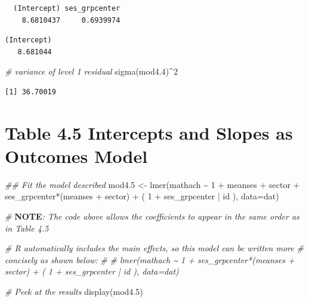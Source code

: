 \documentclass[
  letterpaper,
  DIV=11,
  numbers=noendperiod]{scrreprt}
\newenvironment{Shaded}{}{}
\newcommand{\AlertTok}[1]{\textcolor[rgb]{1.00,0.00,0.00}{\textbf{#1}}}
\newcommand{\AttributeTok}[1]{\textcolor[rgb]{0.49,0.56,0.16}{#1}}
\newcommand{\CommentTok}[1]{\textcolor[rgb]{0.38,0.63,0.69}{\textit{#1}}}
\newcommand{\DecValTok}[1]{\textcolor[rgb]{0.25,0.63,0.44}{#1}}
\newcommand{\DocumentationTok}[1]{\textcolor[rgb]{0.73,0.13,0.13}{\textit{#1}}}
\newcommand{\FloatTok}[1]{\textcolor[rgb]{0.25,0.63,0.44}{#1}}
\newcommand{\FunctionTok}[1]{\textcolor[rgb]{0.02,0.16,0.49}{#1}}
\newcommand{\NormalTok}[1]{#1}
\newcommand{\OtherTok}[1]{\textcolor[rgb]{0.00,0.44,0.13}{#1}}
\newcommand{\SpecialCharTok}[1]{\textcolor[rgb]{0.25,0.44,0.63}{#1}}
\begin{document}
\begin{verbatim}
  (Intercept) ses_grpcenter 
    8.6810437     0.6939974 
\end{verbatim}

\begin{Shaded}
\end{Shaded}

\begin{verbatim}
(Intercept) 
   8.681044 
\end{verbatim}

\begin{Shaded}
\begin{Highlighting}[]
\CommentTok{\# variance of level 1 residual}
\FunctionTok{sigma}\NormalTok{(mod4}\FloatTok{.4}\NormalTok{)}\SpecialCharTok{\^{}}\DecValTok{2}
\end{Highlighting}
\end{Shaded}

\begin{verbatim}
[1] 36.70019
\end{verbatim}

\section{Table 4.5 Intercepts and Slopes as Outcomes
Model}\label{table-4.5-intercepts-and-slopes-as-outcomes-model}

\begin{Shaded}
\begin{Highlighting}[]
\DocumentationTok{\#\# Fit the model described }
\NormalTok{mod4}\FloatTok{.5} \OtherTok{\textless{}{-}} \FunctionTok{lmer}\NormalTok{(mathach }\SpecialCharTok{\textasciitilde{}} \DecValTok{1} \SpecialCharTok{+}\NormalTok{ meanses }\SpecialCharTok{+}\NormalTok{ sector }\SpecialCharTok{+}\NormalTok{ ses\_grpcenter}\SpecialCharTok{*}\NormalTok{(meanses }\SpecialCharTok{+}\NormalTok{ sector) }\SpecialCharTok{+}\NormalTok{ ( }\DecValTok{1} \SpecialCharTok{+}\NormalTok{ ses\_grpcenter }\SpecialCharTok{|}\NormalTok{ id ), }\AttributeTok{data=}\NormalTok{dat)}

\CommentTok{\# }\AlertTok{NOTE}\CommentTok{: The code above allows the coefficients to appear in the same order as in Table 4.5}

\CommentTok{\# R automatically includes the main effects, so this model can be written more}
\CommentTok{\# concisely as shown below:}
\CommentTok{\#}
\CommentTok{\# lmer(mathach \textasciitilde{} 1 + ses\_grpcenter*(meanses + sector) + ( 1 + ses\_grpcenter | id ), data=dat)}

\CommentTok{\# Peek at the results}
\FunctionTok{display}\NormalTok{(mod4}\FloatTok{.5}\NormalTok{)}
\end{Highlighting}
\end{Shaded}
\end{document}
